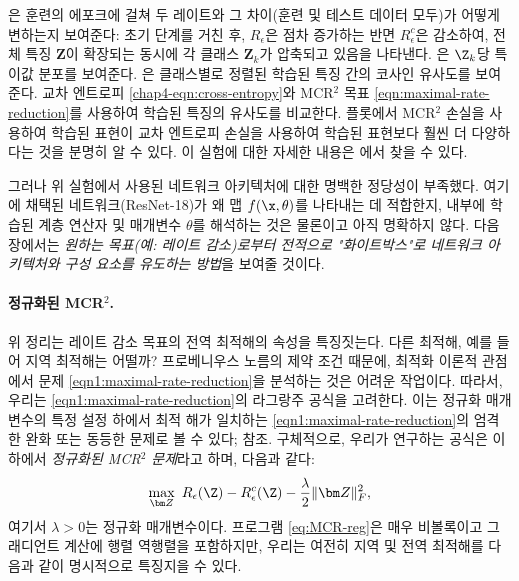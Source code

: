 \documentclass[../../book-main_ko.tex]{subfiles}
\begin{document}
\begin{example}
        은 훈련의 에포크에 걸쳐 두 레이트와 그 차이(훈련 및 테스트 데이터 모두)가 어떻게 변하는지 보여준다: 초기 단계를 거친 후, $R_\epsilon$은 점차 증가하는 반면 $R^c_\epsilon$은 감소하여, 전체 특징 $\bm Z$이 확장되는 동시에 각 클래스 $\bm Z_k$가 압축되고 있음을 나타낸다.
        은 $\Z_k$당 특이값 분포를 보여준다. 은 클래스별로 정렬된 학습된 특징 간의 코사인 유사도를 보여준다. 교차 엔트로피 \eqref{chap4-eqn:cross-entropy}와 MCR$^2$ 목표 \eqref{eqn:maximal-rate-reduction}를 사용하여 학습된 특징의 유사도를 비교한다. 플롯에서 MCR$^2$ 손실을 사용하여 학습된 표현이 교차 엔트로피 손실을 사용하여 학습된 표현보다 훨씬 더 다양하다는 것을 분명히 알 수 있다. 이 실험에 대한 자세한 내용은 \cite{chan2021redunet}에서 찾을 수 있다.
        \label{eg:Rate-Reduction-CIFAR10}
\end{example}


그러나 위 실험에서 사용된 네트워크 아키텍처에 대한 명백한 정당성이 부족했다. 여기에 채택된 네트워크(ResNet-18)가 왜 맵 $f(\x, \theta)$를 나타내는 데 적합한지, 내부에 학습된 계층 연산자 및 매개변수 $\theta$를 해석하는 것은 물론이고 아직 명확하지 않다. 다음 장에서는 {\em 원하는 목표(예: 레이트 감소)로부터 전적으로 "화이트박스"로 네트워크 아키텍처와 구성 요소를 유도하는 방법}을 보여줄 것이다.



\paragraph{정규화된 MCR$^2$.}
위 정리는 레이트 감소 목표의 전역 최적해의 속성을 특징짓는다. 다른 최적해, 예를 들어 지역 최적해는 어떨까? 프로베니우스 노름의 제약 조건 때문에, 최적화 이론적 관점에서 문제 \eqref{eqn1:maximal-rate-reduction}을 분석하는 것은 어려운 작업이다. 따라서, 우리는 \eqref{eqn1:maximal-rate-reduction}의 라그랑주 공식을 고려한다. 이는 정규화 매개변수의 특정 설정 하에서 최적 해가 일치하는 \eqref{eqn1:maximal-rate-reduction}의 엄격한 완화 또는 동등한 문제로 볼 수 있다; \cite[Proposition 1]{wang2024global} 참조.
구체적으로, 우리가 연구하는 공식은 이하에서 \textit{정규화된 MCR$^2$ 문제}라고 하며, 다음과 같다:
\begin{align}\label{eq:MCR-reg}
        \max_{\bm Z}\ R_{\epsilon}(\Z) - R_{\epsilon}^c(\Z) - \frac{\lambda}{2}\|\bm Z\|_F^2,
\end{align}
여기서 $\lambda > 0$는 정규화 매개변수이다. 프로그램 \eqref{eq:MCR-reg}은 매우 비볼록이고 그래디언트 계산에 행렬 역행렬을 포함하지만, 우리는 여전히 지역 및 전역 최적해를 다음과 같이 명시적으로 특징지을 수 있다.
\end{document}

